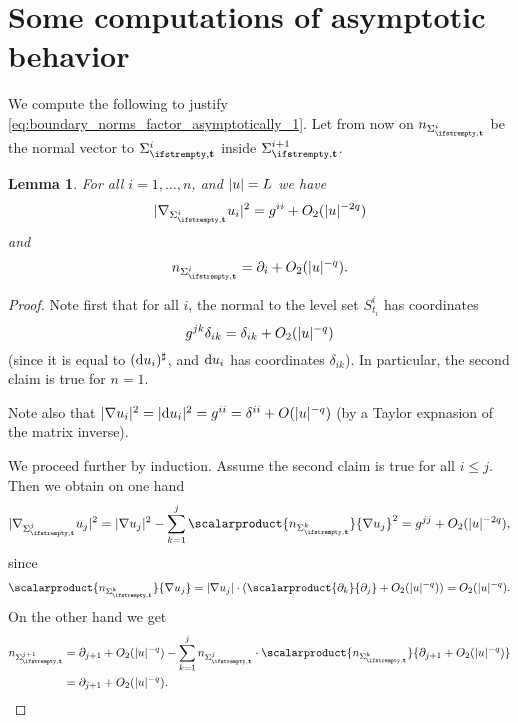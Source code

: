 \documentclass[draft]{amsart}
\newtheorem{lemma}[theorem]{Lemma}
\newcommand*{\mathcomma}{,}
\newcommand*{\mathfullstop}{.}
\DeclarePairedDelimiter{\abs}{\lvert}{\rvert} %
\begin{document}
\section{Some computations of asymptotic behavior}
We compute the following to justify \cref{eq:boundary_norms_factor_asymptotically_1}. Let from now on \( n_{\nls^i} \) be the normal vector to \( \nls^i \) inside \( \nls^{i+1} \).
\begin{lemma}\label{lem:asymptotic_behavior}
    For all \( i=1,\dotsc,n \), and \( \abs{u}=L \) we have
    \begin{equation*}
        \abs{\nabla_{\nls^i}u_i}^2=g^{ii}+O_2(\abs{u}^{-2q})
    \end{equation*}
    and 
    \begin{equation*}
        n_{\nls^i}=\partial_i+O_2(\abs{u}^{-q}).
    \end{equation*}
\end{lemma}
\begin{proof}
    Note first that for all \( i \), the normal to the level set \( S_{t_i}^i \)  has coordinates 
    \begin{equation*}
        g^{jk}\delta_{ik}=\delta_{ik}+O_2(\abs{u}^{-q})
    \end{equation*} 
    (since it is equal to \( (\odif{u_i})^\sharp \), and \( \odif{u_i} \) has coordinates \( \delta_{ik} \)). In particular, the second claim is true for \( n=1 \).

    Note also that \( \abs{\nabla u_i}^2=\abs{\odif{u_i}}^2=g^{ii}=\delta^{ii}+O(\abs{u}^{-q}) \) (by a Taylor expnasion of the matrix inverse).
    
    We proceed further by induction. Assume the second claim is true for all \( i\leq j \). Then we obtain on one hand
    \begin{equation*}
        \abs{\nabla_{\nls^j}u_j}^2=\abs{\nabla u_j}^2-\sum_{k=1}^{j}\scalarproduct{n_{\nls^k}}{\nabla u_j}^2=g^{jj}+O_2(\abs{u}^{-2q})\mathcomma
    \end{equation*}
    since
    \begin{equation*}
        \scalarproduct{n_{\nls^k}}{\nabla u_j}=\abs{\nabla u_j}\cdot (\scalarproduct{\partial_k}{\partial_j}+O_2(\abs{u}^{-q}))=O_2(\abs{u}^{-q})\mathfullstop
    \end{equation*}
    On the other hand we get
    \begin{align*}
        n_{\nls^{j+1}}&=\partial_{j+1}+O_2(\abs{u}^{-q})-\sum_{k=1}^{j}n_{\nls^j}\cdot \scalarproduct{n_{\nls^k}}{\partial_{j+1}+O_2(\abs{u}^{-q})}\\
        &=\partial_{j+1}+O_2(\abs{u}^{-q}).
    \end{align*}
\end{proof}
\end{document}
